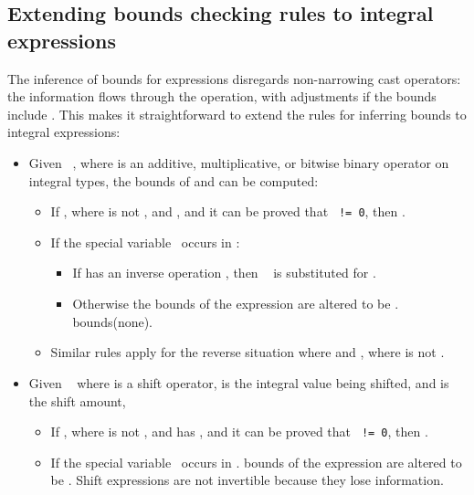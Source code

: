 \subsection{Extending bounds checking rules to integral
expressions}

The inference of bounds for expressions disregards non-narrowing cast operators:
the  information flows through the operation, with adjustments if the bounds
include \exprcurrentvalue.  This makes it straightforward to extend the
rules for inferring bounds to integral expressions:

\begin{itemize}
\item
  Given \texttt{  }, where  is an additive, multiplicative, or bitwise
  binary operator on integral types, the bounds of  and  can be
  computed:

  \begin{itemize}
  \item
    If , where  is not \boundsnone, and 
    , and it can be proved that \texttt{ != 0}, then
    .
  \item
    If the special variable \exprcurrentvalue\ occurs in :
    \begin{itemize}
    \item
      If  has an inverse operation , then 
      \texttt{\exprcurrentvalue {} }
      is substituted for \exprcurrentvalue.
    \item
      Otherwise the bounds of the expression are altered to be \boundsnone.
      bounds(none).
    \end{itemize}
  \item
    Similar rules apply for the reverse situation where 
    and , where  is not \boundsnone.
  \end{itemize}
\item
  Given \texttt{  } where  is a shift operator,  is the integral value
  being shifted, and  is the shift amount,

  \begin{itemize}
  \item
    If , where  is not \boundsnone, and  has
    \boundsnone, and it can be proved that \texttt{ != 0}, then .
  \item
    If the special variable \exprcurrentvalue\ occurs in .
    bounds of the expression are altered to be \boundsnone. Shift
    expressions are not invertible because they lose information.
  \end{itemize}
\end{itemize}

